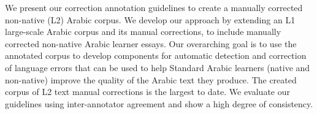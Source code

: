 We present our correction annotation guidelines to create a manually corrected non-native (L2) Arabic corpus. We develop our approach by extending an L1 large-scale Arabic corpus and its manual  corrections, to include manually corrected non-native Arabic learner essays. Our overarching goal is to use the annotated corpus to develop components for automatic detection and correction of  language errors                    that can be used to help Standard Arabic learners (native and non-native) improve the quality of the Arabic text they produce. The created corpus of L2 text manual corrections is the largest to date. We evaluate our guidelines using inter-annotator agreement and show a high degree of consistency.
